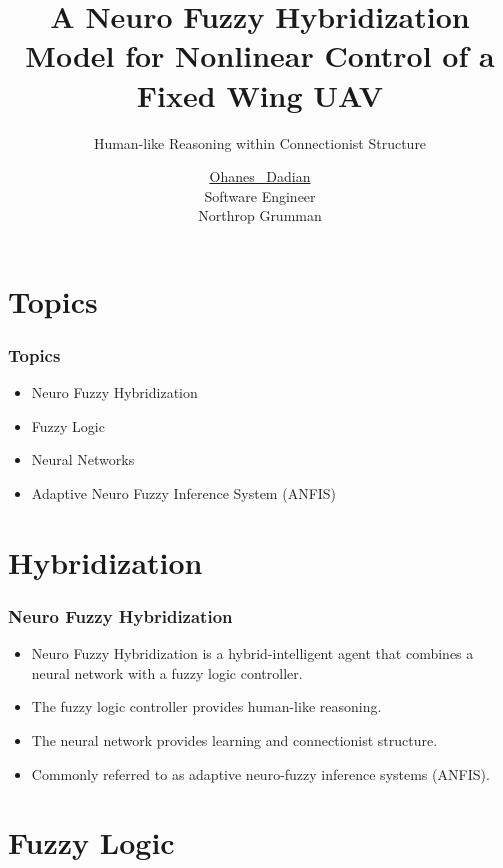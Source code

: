 \documentclass{beamer}
\title[Neuro Fuzzy Hybridization]
   {A Neuro Fuzzy Hybridization Model for Nonlinear Control of a Fixed Wing UAV}
\subtitle{Human-like Reasoning within Connectionist Structure}
\author[Dadian]
   {\underline{Ohanes ~Dadian\inst{1}}\\
   Software Engineer\\
   Northrop Grumman}
\begin{document}
   \frame{\titlepage}

   \section{Topics}
   
   \begin{frame}
      \frametitle{Topics}
      \begin{itemize}
         \item Neuro Fuzzy Hybridization
         \item Fuzzy Logic
         \item Neural Networks
         \item Adaptive Neuro Fuzzy Inference System (ANFIS)
      \end{itemize}
   \end{frame}
   
   \section{Hybridization}

   \begin{frame}
      \frametitle{Neuro Fuzzy Hybridization}
      \begin{itemize}
         \item Neuro Fuzzy Hybridization is a hybrid-intelligent agent that combines a neural network with a fuzzy logic controller.
         \item The fuzzy logic controller provides human-like reasoning.
         \item The neural network provides learning and connectionist structure.
         \item Commonly referred to as adaptive neuro-fuzzy inference systems (ANFIS).
      \end{itemize}
   \end{frame}

   \section{Fuzzy Logic}
\end{document}
